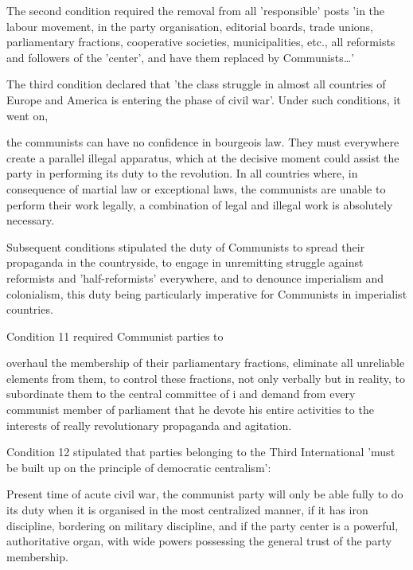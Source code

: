 The second condition required the removal from all 'responsible' posts 'in the labour movement, in the party organisation, editorial boards, trade unions, parliamentary fractions, cooperative societies, municipalities, etc., all reformists and followers of the 'center', and have them replaced by Communists\dots{}'

The third condition declared that 'the class struggle in almost all countries of Europe and America is entering the phase of civil war'. Under such conditions, it went on,
\begin{displayquote}
    the communists can have no confidence in bourgeois law. They must everywhere create a parallel illegal apparatus, which at the decisive moment could assist the party in performing its duty to the revolution. In all countries where, in consequence of martial law or exceptional laws, the communists are unable to perform their work legally, a combination of legal and illegal work is absolutely necessary.
\end{displayquote}

Subsequent conditions stipulated the duty of Communists to spread their propaganda in the countryside, to engage in unremitting struggle against reformists and 'half-reformists' everywhere, and to denounce imperialism and colonialism, this duty being particularly imperative for Communists in imperialist countries.

Condition 11 required Communist parties to
\begin{displayquote}
    overhaul the membership of their parliamentary fractions, eliminate all unreliable elements from them, to control these fractions, not only verbally but in reality, to subordinate them to the central committee of i and demand from every communist member of parliament that he devote his entire activities to the interests of really revolutionary propaganda and agitation.
\end{displayquote}

Condition 12 stipulated that parties belonging to the Third International 'must be built up on the principle of democratic centralism':
\begin{displayquote}
    Present time of acute civil war, the communist party will only be able fully to do its duty when it is organised in the most centralized manner, if it has iron discipline, bordering on military discipline, and if the party center is a powerful, authoritative organ, with wide powers possessing the general trust of the party membership.
\end{displayquote}

